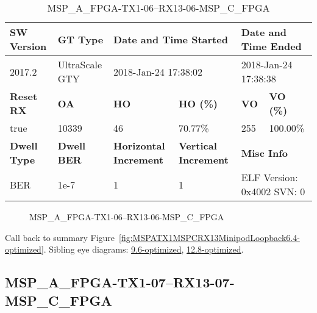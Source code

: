 \begin{table}[h]
\centering
\caption{MSP\_A\_FPGA-TX1-06--RX13-06-MSP\_C\_FPGA}
\label{tab:MSPAFPGATX106RX1306MSPCFPGA6.4-optimized}
\begin{tabular}{@{}|l|l|l|l|l|l|@{}}
\toprule
\textbf{SW Version}                & \textbf{GT Type}   & \multicolumn{2}{l|}{\textbf{Date and Time Started}}            & \multicolumn{2}{l|}{\textbf{Date and Time Ended}}        \\ \midrule
2017.2                       & UltraScale GTY          & \multicolumn{2}{l|}{2018-Jan-24 17:38:02}                   & \multicolumn{2}{l|}{2018-Jan-24 17:38:38}               \\ \midrule
\textbf{Reset RX}                  & \textbf{OA} & \textbf{HO}   & \textbf{HO (\%)} & \textbf{VO} & \textbf{VO (\%)} \\ \midrule
true & 10339        & 46          & 70.77\%        & 255        & 100.00\%       \\ \midrule
\textbf{Dwell Type}                & \textbf{Dwell BER} & \textbf{Horizontal Increment} & \textbf{Vertical Increment}    & \multicolumn{2}{l|}{\textbf{Misc Info}}                  \\ \midrule
BER                            & 1e-7        & 1        & 1           & \multicolumn{2}{l|}{ELF Version: 0x4002 SVN: 0}                         \\ \bottomrule
\end{tabular}
\end{table}

\begin{figure}[h]
\caption{MSP\_A\_FPGA-TX1-06--RX13-06-MSP\_C\_FPGA} \label{fig:MSPAFPGATX106RX1306MSPCFPGA6.4-optimized}
\end{figure}

Call back to summary Figure~\ref{fig:MSPATX1MSPCRX13MinipodLoopback6.4-optimized}.
Sibling eye diagrams: \hyperref[sec:MSPAFPGATX106RX1306MSPCFPGA9.6-optimized]{9.6-optimized}, \hyperref[sec:MSPAFPGATX106RX1306MSPCFPGA12.8-optimized]{12.8-optimized}.

\clearpage
\newpage


\subsection{MSP\_A\_FPGA-TX1-07--RX13-07-MSP\_C\_FPGA}\label{sec:MSPAFPGATX107RX1307MSPCFPGA6.4-optimized}

